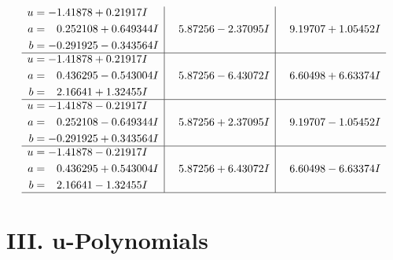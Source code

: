 \documentclass[1p]{elsarticle_modified}
\theoremstyle{definition}
\begin{document}
$$\begin{array}{c|c|c}
\begin{aligned}
u &= -1.41878 + 0.21917 I \\
a &= \phantom{-}0.252108 + 0.649344 I \\
b &= -0.291925 - 0.343564 I\end{aligned}
 & \phantom{-}5.87256 - 2.37095 I & \phantom{-}9.19707 + 1.05452 I \\ \hline\begin{aligned}
u &= -1.41878 + 0.21917 I \\
a &= \phantom{-}0.436295 - 0.543004 I \\
b &= \phantom{-}2.16641 + 1.32455 I\end{aligned}
 & \phantom{-}5.87256 - 6.43072 I & \phantom{-}6.60498 + 6.63374 I \\ \hline\begin{aligned}
u &= -1.41878 - 0.21917 I \\
a &= \phantom{-}0.252108 - 0.649344 I \\
b &= -0.291925 + 0.343564 I\end{aligned}
 & \phantom{-}5.87256 + 2.37095 I & \phantom{-}9.19707 - 1.05452 I \\ \hline\begin{aligned}
u &= -1.41878 - 0.21917 I \\
a &= \phantom{-}0.436295 + 0.543004 I \\
b &= \phantom{-}2.16641 - 1.32455 I\end{aligned}
 & \phantom{-}5.87256 + 6.43072 I & \phantom{-}6.60498 - 6.63374 I\\
 \hline 
 \end{array}$$\newpage
\newpage\renewcommand{\arraystretch}{1}
\centering \section*{ III. u-Polynomials}
\end{document}
